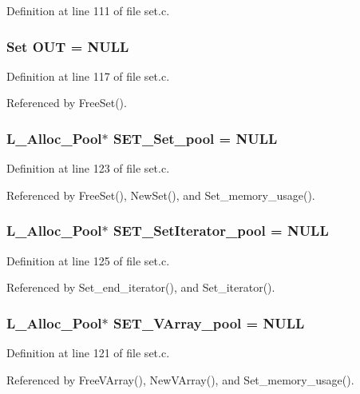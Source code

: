Definition at line 111 of file set.c.
\subsubsection{\setlength{\rightskip}{0pt plus 5cm}\bf{Set} \bf{OUT} = NULL}\label{set_8c_b46ca70cb56d2043b94e054e7998b42a}




Definition at line 117 of file set.c.

Referenced by Free\-Set().
\subsubsection{\setlength{\rightskip}{0pt plus 5cm}\bf{L\_\-Alloc\_\-Pool}$\ast$ \bf{SET\_\-Set\_\-pool} = NULL}\label{set_8c_e308ef399bba1238a939641d3300e729}




Definition at line 123 of file set.c.

Referenced by Free\-Set(), New\-Set(), and Set\_\-memory\_\-usage().
\subsubsection{\setlength{\rightskip}{0pt plus 5cm}\bf{L\_\-Alloc\_\-Pool}$\ast$ \bf{SET\_\-Set\-Iterator\_\-pool} = NULL}\label{set_8c_28c730b960bfb9bdb74bc3b20723dbad}




Definition at line 125 of file set.c.

Referenced by Set\_\-end\_\-iterator(), and Set\_\-iterator().
\subsubsection{\setlength{\rightskip}{0pt plus 5cm}\bf{L\_\-Alloc\_\-Pool}$\ast$ \bf{SET\_\-VArray\_\-pool} = NULL}\label{set_8c_b6ffa6c1aa06fc95f08cff9126697e23}




Definition at line 121 of file set.c.

Referenced by Free\-VArray(), New\-VArray(), and Set\_\-memory\_\-usage().
